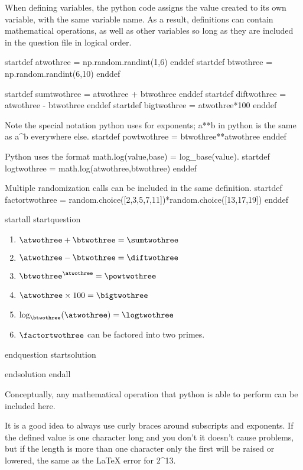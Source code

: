 
When defining variables, the python code assigns the value created to its own variable, with the same variable name. As a result, definitions can contain mathematical operations, as well as other variables so long as they are included in the question file in logical order.

startdef atwothree = np.random.randint(1,6) enddef
startdef btwothree = np.random.randint(6,10) enddef

startdef sumtwothree = atwothree + btwothree enddef
startdef diftwothree = atwothree - btwothree enddef
startdef bigtwothree = atwothree*100 enddef

Note the special notation python uses for exponents; a**b in python is the same as a^b everywhere else.
startdef powtwothree = btwothree**atwothree enddef 

Python uses the format math.log(value,base) = log_base(value).
startdef logtwothree = math.log(atwothree,btwothree) enddef

Multiple randomization calls can be included in the same definition.
startdef factortwothree = random.choice([2,3,5,7,11])*random.choice([13,17,19]) enddef

startall
startquestion \begin{enumerate}
\item $\atwothree + \btwothree = \sumtwothree$
\item $\atwothree - \btwothree = \diftwothree$
\item $\btwothree^{\atwothree} = \powtwothree$
\item $\atwothree \times 100 = \bigtwothree$
\item $\log_{\btwothree}(\atwothree) = \logtwothree$
\item $\factortwothree$ can be factored into two primes.
\end{enumerate} endquestion
startsolution \item  endsolution
endall

Conceptually, any mathematical operation that python is able to perform can be included here.

It is a good idea to always use curly braces around subscripts and exponents. If the defined value is one character long and you don't it doesn't cause problems, but if the length is more than one character only the first will be raised or lowered, the same as the LaTeX error for 2^13.



